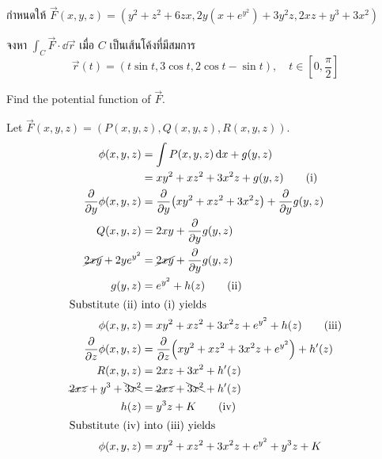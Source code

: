 \documentclass[12pt,final]{novelette} %
\begin{document}
\begin{question}
    \item {}
    กำหนดให้ $\vec{F}(x, y, z) = (y^2 + z^2 + 6zx, 2y(x + e^{y^2}) + 3y^2z, 2xz + y^3 + 3x^2)$

    \begin{question}
        \item
        จงหา $\int_C \vec{F} \cdot \dd{\vec{r}}$ เมื่อ $C$ เป็นเส้นโค้งที่มีสมการ
        $$
            \vec{r}(t) = (t \sin t, 3 \cos t, 2 \cos t - \sin t), \quad t \in \left[0, \frac\pi2\right]
        $$

        \bigskip
        Find the potential function of $\vec{F}$.

        \medskip
        Let $\vec{F}(x, y, z) = (P(x, y, z), Q(x, y, z), R(x, y, z))$.
        \begin{align*}
            \phi(x, y, z)                       & = \int P(x, y, z) \dd{x} + g(y, z)                \\
                                                & = xy^2 + xz^2 + 3x^2z + g(y, z) \tag{i}           \\
            \pdv{y} \phi(x, y, z)               & = \pdv{y} (xy^2 + xz^2 + 3x^2z) + \pdv{y} g(y, z) \\
            Q(x, y, z)                          & = 2xy + \pdv{y} g(y, z)                           \\
            \cancel{2xy} + 2ye^{y^2}            & = \cancel{2xy} + \pdv{y} g(y, z)                  \\
            g(y, z)                             & = e^{y^2} + h(z) \tag{ii}                         \\
            \intertext{Substitute (ii) into (i) yields}
            \phi(x, y, z)                       & = xy^2 + xz^2 + 3x^2z + e^{y^2} + h(z) \tag{iii}  \\
            \pdv{z} \phi(x, y, z)               & = \pdv{z} (xy^2 + xz^2 + 3x^2z + e^{y^2}) + h'(z) \\
            R(x, y, z)                          & = 2xz + 3x^2 + h'(z)                              \\
            \cancel{2xz} + y^3 + \bcancel{3x^2} & = \cancel{2xz} + \bcancel{3x^2} + h'(z)           \\
            h(z)                                & = y^3z + K \tag{iv}                               \\
            \intertext{Substitute (iv) into (iii) yields}
            \phi(x, y, z)                       & = xy^2 + xz^2 + 3x^2z + e^{y^2} + y^3z + K
        \end{align*}


\end{question}
\end{question}
\end{document}
